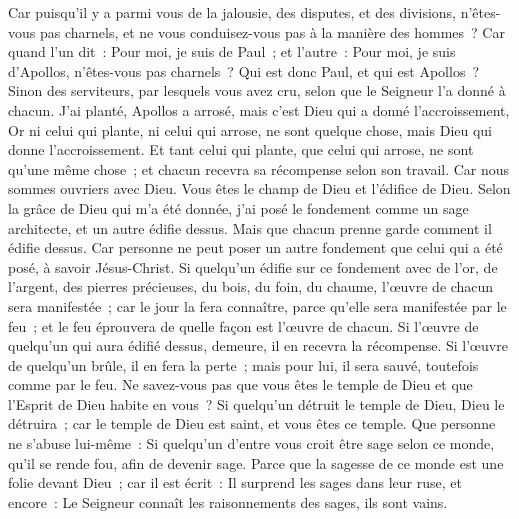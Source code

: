 \begin{multicols}{2}
Car puisqu'il y a parmi vous de la jalousie, des disputes, et des divisions, n'êtes-vous pas charnels, et ne vous conduisez-vous pas à la manière des hommes~?
Car quand l'un dit~: Pour moi, je suis de Paul~; et l'autre~: Pour moi, je suis d'Apollos, n'êtes-vous pas charnels~?
Qui est donc Paul, et qui est Apollos~? Sinon des serviteurs, par lesquels vous avez cru, selon que le Seigneur l'a donné à chacun.
J'ai planté, Apollos a arrosé, mais c'est Dieu qui a donné l'accroissement,
Or ni celui qui plante, ni celui qui arrose, ne sont quelque chose, mais Dieu qui donne l'accroissement.
Et tant celui qui plante, que celui qui arrose, ne sont qu'une même chose~; et chacun recevra sa récompense selon son travail.
Car nous sommes ouvriers avec Dieu. Vous êtes le champ de Dieu et l'édifice de Dieu.
Selon la grâce de Dieu qui m'a été donnée, j'ai posé le fondement comme un sage architecte, et un autre édifie dessus. Mais que chacun prenne garde comment il édifie dessus.
Car personne ne peut poser un autre fondement que celui qui a été posé, à savoir Jésus-Christ.
Si quelqu'un édifie sur ce fondement avec de l'or, de l'argent, des pierres précieuses, du bois, du foin, du chaume, l'œuvre de chacun sera manifestée~;
car le jour la fera connaître, parce qu'elle sera manifestée par le feu~; et le feu éprouvera de quelle façon est l'œuvre de chacun.
Si l'œuvre de quelqu'un qui aura édifié dessus, demeure, il en recevra la récompense.
Si l'œuvre de quelqu'un brûle, il en fera la perte~; mais pour lui, il sera sauvé, toutefois comme par le feu. 
Ne savez-vous pas que vous êtes le temple de Dieu et que l'Esprit de Dieu habite en vous~?
Si quelqu'un détruit le temple de Dieu, Dieu le détruira~; car le temple de Dieu est saint, et vous êtes ce temple.
Que personne ne s'abuse lui-même~: Si quelqu'un d'entre vous croit être sage selon ce monde, qu'il se rende fou, afin de devenir sage.
Parce que la sagesse de ce monde est une folie devant Dieu~; car il est écrit~: Il surprend les sages dans leur ruse,
et encore~: Le Seigneur connaît les raisonnements des sages, ils sont vains.

\end{multicols}
